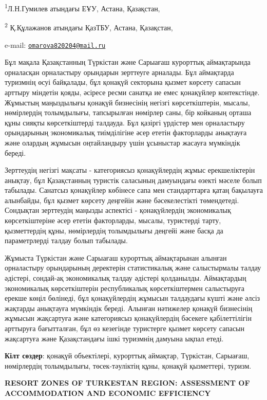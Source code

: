 \textsuperscript{1}Л.Н.Гумилев атындағы ЕҰУ, Астана, Қазақстан,

\textsuperscript{2} Қ.Құлажанов атындағы ҚазТБУ, Астана, Қазақстан,

e-mail:
\href{mailto:omarova820204@mail.ru}{\nolinkurl{omarova820204@mail.ru}}

Бұл мақала Қазақстанның Түркістан және Сарыағаш курорттық аймақтарында
орналасқан орналастыру орындарын зерттеуге арналады. Бұл аймақтарда
туризмнің өсуі байқалады, бұл қонақүй секторына қызмет көрсету сапасын
арттыру міндетін қояды, әсіресе ресми санатқа ие емес қонақүйлер
контекстінде. Жұмыстың маңыздылығы қонақүй бизнесінің негізгі
көрсеткіштерін, мысалы, нөмірлердің толымдылығы, тапсырылған нөмірлер
саны, бір койканың орташа құны сияқты көрсеткіштерді талдауда. Бұл
қазіргі үрдістер мен орналастыру орындарының экономикалық тиімділігіне
әсер ететін факторларды анықтауға және олардың жұмысын оңтайландыру үшін
ұсыныстар жасауға мүмкіндік береді.

Зерттеудің негізгі мақсаты - категориясыз қонақүйлердің жұмыс
ерекшеліктерін анықтау, бұл Қазақстанның туристік саласының дамуындағы
өзекті мәселе болып табылады. Санатсыз қонақүйлер көбінесе сапа мен
стандарттарға қатаң бақылауға алынбайды, бұл қызмет көрсету деңгейін
және бәсекелестікті төмендетеді. Сондықтан зерттеудің маңызды аспектісі
- қонақүйлердің экономикалық көрсеткіштеріне әсер ететін факторларды,
мысалы, туристерді тарту, қызметтердің құны, нөмірлердің толымдылығы
деңгейі және басқа да параметрлерді талдау болып табылады.

Жұмыста Түркістан және Сарыағаш курорттық аймақтарынан алынған
орналастыру орындарының деректерін статистикалық және салыстырмалы
талдау әдістері, сондай-ақ экономикалық талдау әдістері қолданылды.
Аймақтардың экономикалық көрсеткіштерін республикалық көрсеткіштермен
салыстыруға ерекше көңіл бөлінеді, бұл қонақүйлердің жұмысын талдаудағы
күшті және әлсіз жақтарды анықтауға мүмкіндік береді. Алынған нәтижелер
қонақүй бизнесінің жұмысын жақсартуға және категориясыз қонақүйлердің
бәсекеге қабілеттілігін арттыруға бағытталған, бұл өз кезегінде
туристерге қызмет көрсету сапасын жақсартуға және Қазақстандағы ішкі
туризмнің дамуына ықпал етеді.

{\bfseries Кілт сөздер}: қонақүй объектілері, курорттық аймақтар,
Түркістан, Сарыағаш, нөмірлердің толымдылығы, төсек-тәуліктің құны,
қонақүй қызметтері, туризм.

{\bfseries RESORT ZONES OF TURKESTAN REGION: ASSESSMENT OF ACCOMMODATION
AND ECONOMIC EFFICIENCY}

